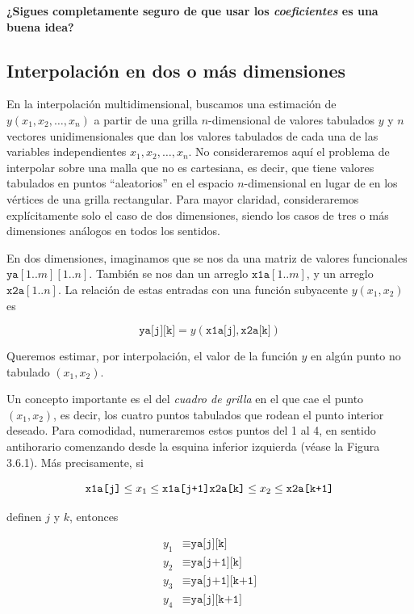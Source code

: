 \documentclass[10pt,a4paper]{book}
\begin{document}
\medskip
\noindent
\textbf{¿Sigues completamente seguro de que usar los \textit{coeficientes} es una buena idea?}

\subsection{Interpolación en dos o más dimensiones}

En la interpolación multidimensional, buscamos una estimación de \( y(x_1, x_2, \ldots, x_n) \) a partir de una grilla \( n \)-dimensional de valores tabulados \( y \) y \( n \) vectores unidimensionales que dan los valores tabulados de cada una de las variables independientes \( x_1, x_2, \ldots, x_n \). No consideraremos aquí el problema de interpolar sobre una malla que no es cartesiana, es decir, que tiene valores tabulados en puntos “aleatorios” en el espacio \( n \)-dimensional en lugar de en los vértices de una grilla rectangular. Para mayor claridad, consideraremos explícitamente solo el caso de dos dimensiones, siendo los casos de tres o más dimensiones análogos en todos los sentidos.

En dos dimensiones, imaginamos que se nos da una matriz de valores funcionales \( \texttt{ya}[1..m][1..n] \). También se nos dan un arreglo \( \texttt{x1a}[1..m] \), y un arreglo \( \texttt{x2a}[1..n] \). La relación de estas entradas con una función subyacente \( y(x_1, x_2) \) es

\begin{equation}
\texttt{ya[j][k]} = y(\texttt{x1a[j]}, \texttt{x2a[k]})
\end{equation}

Queremos estimar, por interpolación, el valor de la función \( y \) en algún punto no tabulado \( (x_1, x_2) \).

Un concepto importante es el del \textit{cuadro de grilla} en el que cae el punto \( (x_1, x_2) \), es decir, los cuatro puntos tabulados que rodean el punto interior deseado. Para comodidad, numeraremos estos puntos del 1 al 4, en sentido antihorario comenzando desde la esquina inferior izquierda (véase la Figura 3.6.1). Más precisamente, si

\begin{equation}
\texttt{x1a[j]} \leq x_1 \leq \texttt{x1a[j+1]} \\
\texttt{x2a[k]} \leq x_2 \leq \texttt{x2a[k+1]}
\end{equation}

definen \( j \) y \( k \), entonces

\begin{align}
y_1 &\equiv \texttt{ya[j][k]} \\
y_2 &\equiv \texttt{ya[j+1][k]} \\
y_3 &\equiv \texttt{ya[j+1][k+1]} \\
y_4 &\equiv \texttt{ya[j][k+1]}
\end{align}
\end{document}
